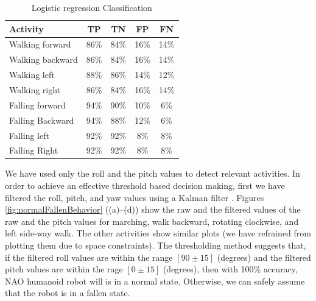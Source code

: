 \documentclass[letterpaper]{article}
\begin{document}
\begin{table}[!ht]
\caption{Logistic regression Classification}
	\label{tab:robot-logistic-class}
	\centering
		\begin{tabular} {| l | c | c | c| c|}
		\hline
			{\bf Activity} & {\bf  TP}  &	{\bf TN}  &	{\bf FP} &	{\bf FN} \\ 
\hline
			Walking forward	& 86\%	& 84\%	& 16\%	& 14\% \\ \hline
			Walking backward	& 86\%	& 84\%	& 16\%	& 14\% \\ \hline
			Walking left 	& 88\%	& 86\%	& 14\%	& 12\% \\ \hline
			Walking right 	& 86\%	& 84\%	& 16\%	& 14\% \\ \hline
			Falling forward	& 94\%	& 90\%	& 10\%	& 6\%	 \\ \hline
			Falling Backward	& 94\%	& 88\%	& 12\%	& 6\%	 \\ \hline
			Falling left	& 92\%	& 92\%	& 8\%	& 8\%	 \\ \hline
			Falling Right	& 92\%	& 92\%	& 8\%	& 8\%	 \\ \hline
		\end{tabular}
\end{table}


We have used only the roll and the pitch values  to detect relevant activities. In order to achieve 
an effective threshold based decision making, first we have filtered the roll, pitch, and
yaw values using a Kalman filter \cite{Welch:1995:IKF:897831}. Figures 
\ref{fig:normalFallenBehavior} ((a)--(d)) show
the raw and the filtered values of the raw and the pitch values for marching, walk backward,
rotating clockwise, and left side-way walk. The other activities show similar plots (we have 
refrained from plotting them due to space constraints). The thresholding method
suggests that, if the filtered roll values are within the range $[90\pm15]$ (degrees) and the
filtered pitch values are within the rage $[0\pm15]$ (degrees), then with 100\% accuracy, NAO 
humanoid robot will is in a normal state. Otherwise, we can safely assume that the robot is in 
a fallen state.   
\end{document}
